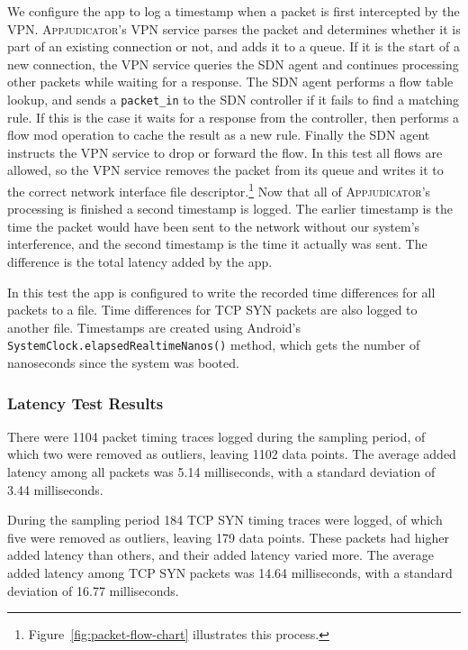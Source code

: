 We configure the app to log a timestamp when a packet is first intercepted by
the VPN. \textsc{Appjudicator}'s VPN service parses the packet and determines
whether it is part of an existing connection or not, and adds it to a queue. If
it is the start of a new connection, the VPN service queries the SDN agent and
continues processing other packets while waiting for a response. The SDN agent
performs a flow table lookup, and sends a \texttt{packet\_in} to the SDN
controller if it fails to find a matching rule. If this is the case it waits for
a response from the controller, then performs a flow mod operation to cache the
result as a new rule. Finally the SDN agent instructs the VPN service to drop or
forward the flow. In this test all flows are allowed, so the VPN service removes
the packet from its queue and writes it to the correct network interface file
descriptor.\footnote{Figure~\ref{fig:packet-flow-chart} illustrates this
process.} Now that all of \textsc{Appjudicator}'s processing is finished a
second timestamp is logged. The earlier timestamp is the time the packet would
have been sent to the network without our system's interference, and the second
timestamp is the time it actually was sent. The difference is the total latency
added by the app.

In this test the app is configured to write the recorded time differences for
all packets to a file. Time differences for TCP SYN packets are also logged to
another file. Timestamps are created using Android's
\texttt{SystemClock.elapsedRealtimeNanos()} method, which gets the number of
nanoseconds since the system was booted.~\cite{androidsystemclock}

\subsubsection{Latency Test Results}
\label{sec:latency-test-results}

There were 1104 packet timing traces logged during the sampling period, of which
two were removed as outliers, leaving 1102 data points. The average added
latency among all packets was 5.14 milliseconds, with a standard deviation of
3.44 milliseconds.

During the sampling period 184 TCP SYN timing traces were logged, of which five
were removed as outliers, leaving 179 data points. These packets had 
higher added latency than others, and their added latency varied more. The
average added latency among TCP SYN packets was 14.64 milliseconds, with a
standard deviation of 16.77 milliseconds.

